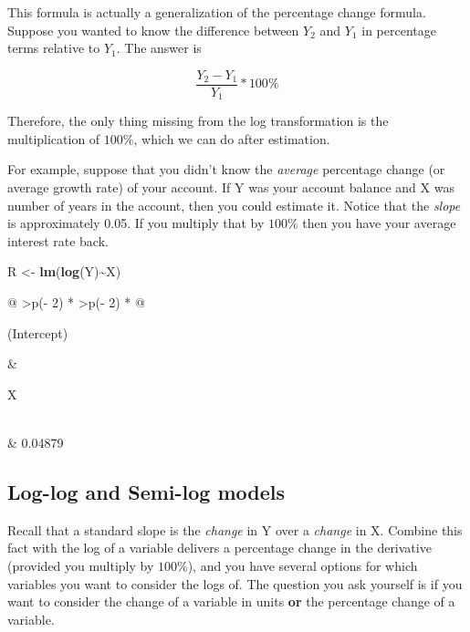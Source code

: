 \documentclass[
]{book}
\newenvironment{Shaded}{\begin{snugshade}}{\end{snugshade}}
\newcommand{\FunctionTok}[1]{\textcolor[rgb]{0.13,0.29,0.53}{\textbf{#1}}}
\newcommand{\NormalTok}[1]{#1}
\newcommand{\OtherTok}[1]{\textcolor[rgb]{0.56,0.35,0.01}{#1}}
\newcommand{\SpecialCharTok}[1]{\textcolor[rgb]{0.81,0.36,0.00}{\textbf{#1}}}
\begin{document}
This formula is actually a generalization of the percentage change formula. Suppose you wanted to know the difference between \(Y_2\) and \(Y_1\) in percentage terms relative to \(Y_1\). The answer is

\[\frac{Y_2 - Y_1}{Y_1} * 100\%\]

Therefore, the only thing missing from the log transformation is the multiplication of \(100\%\), which we can do after estimation.

For example, suppose that you didn't know the \emph{average} percentage change (or average growth rate) of your account. If Y was your account balance and X was number of years in the account, then you could estimate it. Notice that the \emph{slope} is approximately 0.05. If you multiply that by \(100\%\) then you have your average interest rate back.

\begin{Shaded}
\begin{Highlighting}[]
\NormalTok{R }\OtherTok{\textless{}{-}} \FunctionTok{lm}\NormalTok{(}\FunctionTok{log}\NormalTok{(Y)}\SpecialCharTok{\textasciitilde{}}\NormalTok{X)}
\end{Highlighting}
\end{Shaded}

\begin{longtable}[]{@{}
  >{\centering\arraybackslash}p{(\columnwidth - 2\tabcolsep) * }
  >{\centering\arraybackslash}p{(\columnwidth - 2\tabcolsep) * }@{}}
\toprule\noalign{}
\begin{minipage}[b]{\linewidth}\centering
(Intercept)
\end{minipage} & \begin{minipage}[b]{\linewidth}\centering
X
\end{minipage} \\
\midrule\noalign{}
\endhead
\bottomrule\noalign{}
 & 0.04879 \\
\end{longtable}

\subsection*{Log-log and Semi-log models}\label{log-log-and-semi-log-models}

Recall that a standard slope is the \emph{change} in Y over a \emph{change} in X. Combine this fact with the log of a variable delivers a percentage change in the derivative (provided you multiply by \(100\%\)), and you have several options for which variables you want to consider the logs of. The question you ask yourself is if you want to consider the change of a variable in units \textbf{or} the percentage change of a variable.
\end{document}
